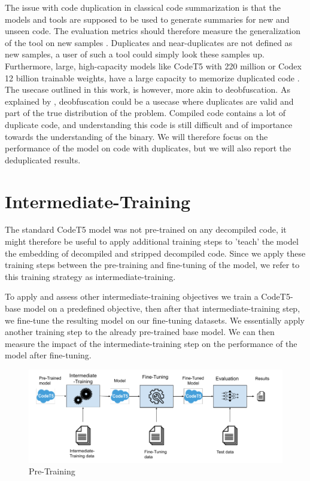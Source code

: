 The issue with code duplication in classical code summarization is that the models and tools are supposed to be used to generate summaries for new and unseen code. The evaluation metrics should therefore measure the generalization of the tool on new samples \cite{allamanis_adverse}. Duplicates and near-duplicates are not defined as new samples, a user of such a tool could simply look these samples up. Furthermore, large, high-capacity models like CodeT5 with 220 million \cite{CodeT5} or Codex 12 billion \cite{CodeX} trainable weights, have a large capacity to memorize duplicated code \cite{allamanis_adverse}.
The usecase outlined in this work, is however, more akin to deobfuscation. As explained by \citeauthor{allamanis_adverse}, deobfuscation could be a usecase where duplicates are valid and part of the true distribution of the problem\cite{allamanis_adverse}. Compiled code contains a lot of duplicate code, and understanding this code is still difficult and of importance towards the understanding of the binary. We will therefore focus on the performance of the model on code with duplicates, but we will also report the deduplicated results.

\section{Intermediate-Training}
The standard CodeT5 model was not pre-trained on any decompiled code, it might therefore be useful to apply additional training steps to 'teach' the model the embedding of decompiled and stripped decompiled code. Since we apply these training steps between the pre-training and fine-tuning of the model, we refer to this training strategy as intermediate-training.

To apply and assess other intermediate-training objectives we train a CodeT5-base model on a predefined objective, then after that intermediate-training step, we fine-tune the resulting model on our fine-tuning datasets. We essentially apply another training step to the already pre-trained base model. We can then measure the impact of the intermediate-training step on the performance of the model after fine-tuning.

\label{fig:preTraining}
\begin{figure}[H]
  \centering
  \includegraphics[width=\linewidth]{img/pre-training.png}
  \caption{Pre-Training}
\end{figure}

